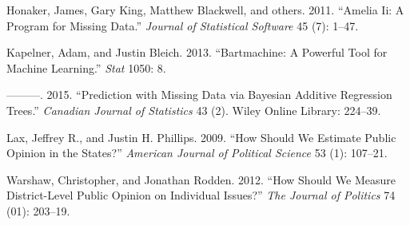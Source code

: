 \documentclass[]{article}
\begin{document}
\hypertarget{ref-honaker2011amelia}{}
Honaker, James, Gary King, Matthew Blackwell, and others. 2011. ``Amelia
Ii: A Program for Missing Data.'' \emph{Journal of Statistical Software}
45 (7): 1--47.

\hypertarget{ref-kapelner2013bartmachine}{}
Kapelner, Adam, and Justin Bleich. 2013. ``Bartmachine: A Powerful Tool
for Machine Learning.'' \emph{Stat} 1050: 8.

\hypertarget{ref-kapelner2015prediction}{}
---------. 2015. ``Prediction with Missing Data via Bayesian Additive
Regression Trees.'' \emph{Canadian Journal of Statistics} 43 (2). Wiley
Online Library: 224--39.

\hypertarget{ref-lax_how_2009}{}
Lax, Jeffrey R., and Justin H. Phillips. 2009. ``How Should We Estimate
Public Opinion in the States?'' \emph{American Journal of Political
Science} 53 (1): 107--21.

\hypertarget{ref-warshaw_how_2012}{}
Warshaw, Christopher, and Jonathan Rodden. 2012. ``How Should We Measure
District-Level Public Opinion on Individual Issues?'' \emph{The Journal
of Politics} 74 (01): 203--19.
\end{document}
